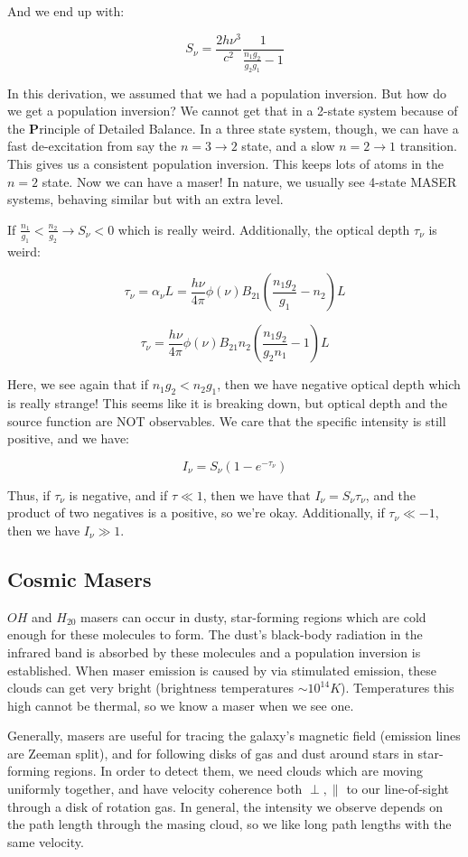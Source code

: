 \documentclass{article}
\newcommand{\be}{\begin{equation}}
\newcommand{\ee}{\end{equation}}
\def\bto{{B_{21}}}
\def\bto{{B_{21}}}
\def\bto{{B_{21}}}
\begin{document}
And we end up with:

\be
S_\nu = \frac{2 h \nu^3}{c^2} \frac{1}{\frac{n_1 g_2 }{g_2 g_1} - 1}
\ee

In this derivation, we assumed that we had a population inversion. But how do we get a population inversion? We cannot get that in a 2-state system because of the {\textbf Principle of Detailed Balance}. In a three state system, though, we can have a fast de-excitation from say the $n = 3 \rightarrow 2$ state, and a slow $n = 2 \rightarrow 1$ transition. This gives us a consistent population inversion. This keeps lots of atoms in the $n=2 $ state. Now we can have a maser! In nature, we usually see 4-state MASER systems, behaving similar but with an extra level. 

If $\frac{n_1}{g_1} < \frac{n_2}{g_2} \rightarrow S_\nu < 0 $ which is really weird. Additionally, the optical depth $\tau_\nu$ is weird:

\be
\tau_\nu = \alpha_\nu L = \frac{h \nu}{4 \pi} \phi(\nu) \bto \left(\frac{n_1 g_2}{g_1} - n_2\right) L
\ee

\be
\tau_\nu = \frac{h \nu}{4 \pi} \phi(\nu) \bto n_2 \left(\frac{n_1 g_2 }{g_2 n_1} - 1\right)L
\ee

Here, we see again that if $n_1 g_2 < n_2 g_1$, then we have negative optical depth which is really strange! This seems like it is breaking down, but optical depth and the source function are NOT observables. We care that the specific intensity is still positive, and we have:

\be
I_\nu = S_\nu \left(1 - e^{-\tau_\nu}\right)
\ee

Thus, if $\tau_\nu$ is negative, and if $\tau \ll 1$, then we have that $I_\nu = S_\nu \tau_\nu$, and the product of two negatives is a positive, so we're okay. Additionally, if $\tau_\nu \ll -1$, then we have $I_\nu \gg 1$.


\subsection{ Cosmic Masers }

$OH$ and $H_20$ masers can occur in dusty, star-forming regions which are cold
enough for these molecules to form.  The dust's black-body radiation in
the infrared band is absorbed by these molecules and a population
inversion is established.  When maser emission is caused by via stimulated
emission, these clouds can get very bright (brightness temperatures $\sim
10^{14}K$).  Temperatures this high cannot be thermal, so we know a maser
when we see one. \par
Generally, masers are useful for tracing the galaxy's magnetic field (emission
lines are Zeeman split), and for following disks of gas and dust around stars
in star-forming regions.  In order to detect them, we need clouds which are
moving uniformly together, and have velocity coherence both $\perp, \|$ to
our line-of-sight through a disk of rotation gas.  
In general, the intensity we observe depends on the
path length through the masing cloud, so we like long path lengths with the
same velocity.
\end{document}
